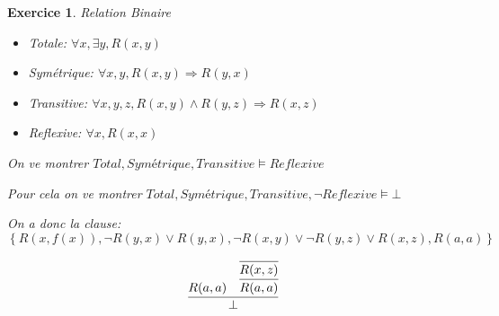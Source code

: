 \documentclass{article}
\theoremstyle{plain}
\newtheorem{exo}{Exercice}%
\begin{document}
\begin{exo} Relation Binaire
\begin{itemize}
  \item Totale: $\forall x, \exists y, R(x, y)$
  \item Symétrique: $\forall x, y, R(x, y) \Rightarrow R(y, x)$
  \item Transitive: $\forall x, y, z, R(x, y) \land R(y, z)
    \Rightarrow R(x, z)$
  \item Reflexive: $\forall x, R(x, x)$
\end{itemize}

  On ve montrer $Total, Symétrique, Transitive \models Reflexive$

  Pour cela on ve montrer $Total, Symétrique, Transitive, \neg Reflexive \models \bot$

  On a donc la clause: $\left\{R(x, f(x)), \neg R(y, x) \vee R(y, x),
    \neg R(x, y) \vee \neg R(y, z) \vee R(x, z), R(a, a)\right\}$

  \[
    \infer{\bot}
    { R(a, a) &
      \infer{R(a, a)}{
        \infer{R(x, z)}{}
      }
    }
  \]
\end{exo}
\end{document}
